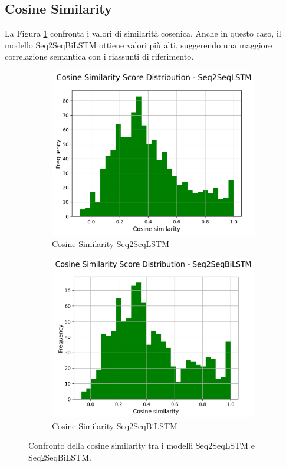 \documentclass[a4paper, 12pt]{article}
\begin{document}
\subsection{Cosine Similarity}
La Figura \ref{fig:cosine_similarity_comparison} confronta i valori di similarità cosenica. Anche in questo caso, il modello Seq2SeqBiLSTM ottiene valori più alti, suggerendo una maggiore correlazione semantica con i riassunti di riferimento.

\begin{figure}[H]
    \centering
    \begin{subfigure}{0.45\textwidth}
        \centering
        \includegraphics[width=\textwidth]{media/Seq2SeqLSTM_cosine_similarity_scores.png}
        \caption{Cosine Similarity Seq2SeqLSTM}
    \end{subfigure}
    \hfill
    \begin{subfigure}{0.45\textwidth}
        \centering
        \includegraphics[width=\textwidth]{media/Seq2SeqBiLSTM_cosine_similarity_scores.png}
        \caption{Cosine Similarity Seq2SeqBiLSTM}
    \end{subfigure}
    \caption{Confronto della cosine similarity tra i modelli Seq2SeqLSTM e Seq2SeqBiLSTM.}
    \label{fig:cosine_similarity_comparison}
\end{figure}
\end{document}
